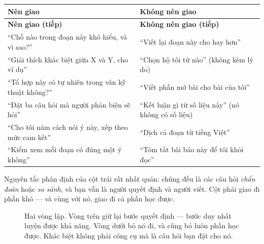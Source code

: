 \documentclass[../../english.tex]{subfiles}
\begin{document}
\begin{center}\footnotesize
{}
\begin{longtable}{@{}L{6.6cm}L{7.8cm}@{}}
\toprule
\textbf{Nên giao} & \textbf{Không nên giao}\\
\midrule
\endfirsthead
\toprule
\textbf{Nên giao (tiếp)} & \textbf{Không nên giao (tiếp)}\\
\midrule
\endhead
``Chỗ nào trong đoạn này khó hiểu, và vì sao?'' & ``Viết lại đoạn này cho hay hơn''\\
``Giải thích khác biệt giữa X và Y, cho ví dụ'' & ``Chọn hộ tôi từ nào'' (không kèm lý do)\\
``Tổ hợp này có tự nhiên trong văn kỹ thuật không?'' & ``Viết phần mở bài cho bài của tôi''\\
``Đặt ba câu hỏi mà người phản biện sẽ hỏi'' & ``Kết luận gì từ số liệu này'' (nó không có số liệu)\\
``Cho tôi năm cách nói ý này, xếp theo mức cam kết'' & ``Dịch cả đoạn từ tiếng Việt''\\
``Kiểm xem mỗi đoạn có đúng một ý không'' & ``Tóm tắt bài báo này để tôi khỏi đọc''\\
\bottomrule
\end{longtable}
\end{center}

Nguyên tắc phân định của cột trái rất nhất quán: chúng đều là các câu hỏi \emph{chẩn đoán} hoặc \emph{so sánh}, và bạn vẫn là người quyết định và người viết. Cột phải giao đi phần khó --- và cùng với nó, giao đi cả phần học được.

\begin{figure}[H]\centering
{}
\caption{Hai vòng lặp. Vòng trên giữ lại bước quyết định --- bước duy nhất luyện được khả năng. Vòng dưới bỏ nó đi, và cũng bỏ luôn phần học được. Khác biệt không phải công cụ mà là câu hỏi bạn đặt cho nó.}
\label{fig:vong-lap-cong-cu}
\end{figure}
\end{document}
